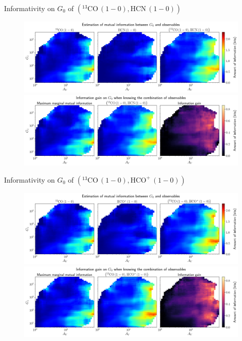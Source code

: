 \documentclass{beamer}
\begin{document}
\begin{frame}{Informativity on $G_0$ of $\left(\mathrm{^{13}CO\,(1-0)},\mathrm{HCN\,(1-0)}\right)$}
    \begin{figure}
        \centering
        \includegraphics[width=0.95\linewidth]{../mi/g0__13co10_hcn10_mi.png}
        \vfill
        \includegraphics[width=0.95\linewidth]{../mi/g0__13co10_hcn10_mi_gain.png}
    \end{figure}
\end{frame}

\begin{frame}{Informativity on $G_0$ of $\left(\mathrm{^{13}CO\,(1-0)},\mathrm{HCO^+\,(1-0)}\right)$}
    \begin{figure}
        \centering
        \includegraphics[width=0.95\linewidth]{../mi/g0__13co10_hcop10_mi.png}
        \vfill
        \includegraphics[width=0.95\linewidth]{../mi/g0__13co10_hcop10_mi_gain.png}
    \end{figure}
\end{frame}
\end{document}
